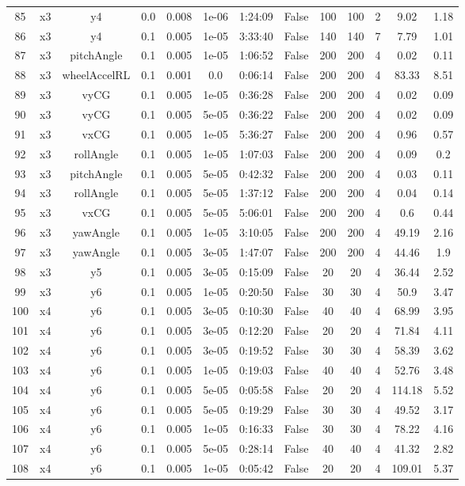 \begin{longtable}{c | c | c | c | c | c | c | c | c | c | c | c | c}
85 & x3 & y4 & 0.0 & 0.008 & 1e-06 & 1:24:09 & False & 100 & 100 & 2 & 9.02 & 1.18 \\
86 & x3 & y4 & 0.1 & 0.005 & 1e-05 & 3:33:40 & False & 140 & 140 & 7 & 7.79 & 1.01 \\
87 & x3 & pitchAngle & 0.1 & 0.005 & 1e-05 & 1:06:52 & False & 200 & 200 & 4 & 0.02 & 0.11 \\
88 & x3 & wheelAccelRL & 0.1 & 0.001 & 0.0 & 0:06:14 & False & 200 & 200 & 4 & 83.33 & 8.51 \\
89 & x3 & vyCG & 0.1 & 0.005 & 1e-05 & 0:36:28 & False & 200 & 200 & 4 & 0.02 & 0.09 \\
90 & x3 & vyCG & 0.1 & 0.005 & 5e-05 & 0:36:22 & False & 200 & 200 & 4 & 0.02 & 0.09 \\
91 & x3 & vxCG & 0.1 & 0.005 & 1e-05 & 5:36:27 & False & 200 & 200 & 4 & 0.96 & 0.57 \\
92 & x3 & rollAngle & 0.1 & 0.005 & 1e-05 & 1:07:03 & False & 200 & 200 & 4 & 0.09 & 0.2 \\
93 & x3 & pitchAngle & 0.1 & 0.005 & 5e-05 & 0:42:32 & False & 200 & 200 & 4 & 0.03 & 0.11 \\
94 & x3 & rollAngle & 0.1 & 0.005 & 5e-05 & 1:37:12 & False & 200 & 200 & 4 & 0.04 & 0.14 \\
95 & x3 & vxCG & 0.1 & 0.005 & 5e-05 & 5:06:01 & False & 200 & 200 & 4 & 0.6 & 0.44 \\
96 & x3 & yawAngle & 0.1 & 0.005 & 1e-05 & 3:10:05 & False & 200 & 200 & 4 & 49.19 & 2.16 \\
97 & x3 & yawAngle & 0.1 & 0.005 & 3e-05 & 1:47:07 & False & 200 & 200 & 4 & 44.46 & 1.9 \\
98 & x3 & y5 & 0.1 & 0.005 & 3e-05 & 0:15:09 & False & 20 & 20 & 4 & 36.44 & 2.52 \\
99 & x3 & y6 & 0.1 & 0.005 & 1e-05 & 0:20:50 & False & 30 & 30 & 4 & 50.9 & 3.47 \\
100 & x4 & y6 & 0.1 & 0.005 & 3e-05 & 0:10:30 & False & 40 & 40 & 4 & 68.99 & 3.95 \\
101 & x4 & y6 & 0.1 & 0.005 & 3e-05 & 0:12:20 & False & 20 & 20 & 4 & 71.84 & 4.11 \\
102 & x4 & y6 & 0.1 & 0.005 & 3e-05 & 0:19:52 & False & 30 & 30 & 4 & 58.39 & 3.62 \\
103 & x4 & y6 & 0.1 & 0.005 & 1e-05 & 0:19:03 & False & 40 & 40 & 4 & 52.76 & 3.48 \\
104 & x4 & y6 & 0.1 & 0.005 & 5e-05 & 0:05:58 & False & 20 & 20 & 4 & 114.18 & 5.52 \\
105 & x4 & y6 & 0.1 & 0.005 & 5e-05 & 0:19:29 & False & 30 & 30 & 4 & 49.52 & 3.17 \\
106 & x4 & y6 & 0.1 & 0.005 & 1e-05 & 0:16:33 & False & 30 & 30 & 4 & 78.22 & 4.16 \\
107 & x4 & y6 & 0.1 & 0.005 & 5e-05 & 0:28:14 & False & 40 & 40 & 4 & 41.32 & 2.82 \\
108 & x4 & y6 & 0.1 & 0.005 & 1e-05 & 0:05:42 & False & 20 & 20 & 4 & 109.01 & 5.37 \\
\end{longtable}